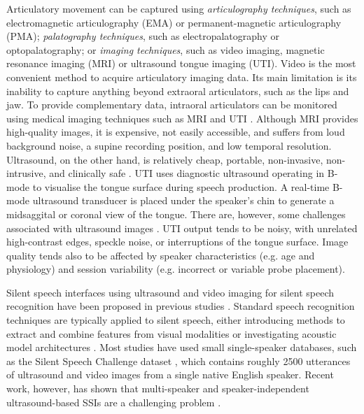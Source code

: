 \documentclass[a4paper]{article}
\begin{document}
Articulatory movement can be captured \cite{schultz2017biosignal} using \emph{articulography techniques}, such as electromagnetic articulography (EMA) or permanent-magnetic articulography (PMA); \emph{palatography techniques}, such as electropalatography or optopalatography; or \emph{imaging techniques}, such as video imaging, magnetic resonance imaging (MRI) or ultrasound tongue imaging (UTI).
Video is the most convenient method to acquire articulatory imaging data.
Its main limitation is its inability to capture anything beyond extraoral articulators, such as the lips and jaw.
To provide complementary data, intraoral articulators can be monitored using medical imaging techniques such as MRI \cite{scott2014speech} and UTI \cite{stone2005guide}. 
Although MRI provides high-quality images, it is expensive, not easily accessible, and suffers from loud background noise, a supine recording position, and low temporal resolution. 
Ultrasound, on the other hand, is relatively cheap, portable, non-invasive, non-intrusive, and clinically safe \cite{stone2005guide}. UTI uses diagnostic ultrasound operating in B-mode to visualise the tongue surface during speech production. A real-time B-mode ultrasound transducer is placed under the speaker’s chin to generate a midsaggital or coronal view of the tongue. 
There are, however, some challenges associated with ultrasound images \cite{stone2005guide, ribeiro2019speaker}.
UTI output tends to be noisy, with unrelated high-contrast edges, speckle noise, or interruptions of the tongue surface.
Image quality tends also to be affected by speaker characteristics (e.g. age and physiology) and session variability (e.g. incorrect or variable probe placement).

Silent speech interfaces using ultrasound and video imaging for silent speech recognition have been proposed in previous studies \cite{hueber2010development, florescu2010silent, tatulli2017feature, ji2018updating, kimura2019sottovoce, kimura2020end}.
Standard speech recognition techniques are typically applied to silent speech, either introducing methods to extract and combine features from visual modalities \cite{tatulli2017feature, liu2016comparison} or investigating acoustic model architectures \cite{hueber2010development, ji2018updating, kimura2019sottovoce, hueber2009visuo}.
Most studies have used small single-speaker databases, such as the Silent Speech Challenge dataset \cite{cai2011recognition}, which contains roughly 2500 utterances of ultrasound and video images from a single native English speaker.
Recent work, however, has shown that multi-speaker and speaker-independent ultrasound-based SSIs are a challenging problem \cite{ribeiro2019speaker, ribeiro2021tal}.
\end{document}

